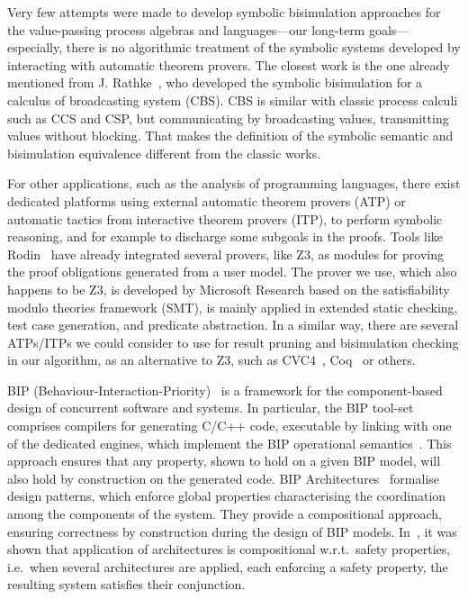 \documentclass[smallcondensed]{svjour3}
\newcommand{\TODO}[1]{\textcolor{red}{\textbf{[TODO:#1]}}}
\newcommand{\mdash}{---}
\newcommand{\ie}[1][\ ]{i.e.#1}
\newcommand{\wrt}[1][\ ]{w.r.t.#1}
\begin{document}


Very few attempts were made to develop symbolic bisimulation approaches
for the value-passing process algebras and languages\mdash our long-term goals\mdash
especially, there is no algorithmic treatment of the symbolic systems developed by
interacting with automatic theorem provers. The closest work is the
one already mentioned from J. Rathke~\cite{HennessyRathke:TCS98},
who developed the symbolic bisimulation for a
calculus of broadcasting system (CBS). CBS is similar with classic
process calculi such as CCS and CSP, but communicating by broadcasting
values, %
transmitting values without blocking. That makes the definition of
the symbolic semantic and bisimulation equivalence different from the
classic works.

For other applications, such as the analysis of 
programming languages, there exist dedicated platforms using
external automatic theorem 
provers (ATP) or automatic tactics from interactive theorem
provers (ITP), to perform symbolic reasoning, and for example to
discharge some subgoals in the proofs.
Tools like Rodin~\cite{deharbe2013,deharbe2014} have
already integrated several provers, like Z3, as modules for proving
the proof obligations generated from a user model. 
The prover we use, which also happens to be Z3, is developed by Microsoft Research
based on the satisfiability modulo 
theories framework (SMT), is mainly applied in extended static checking, test case
generation, and predicate abstraction.
In a similar way, there are several ATPs/ITPs we could consider to use for
result pruning and bisimulation checking in our algorithm, as an
alternative to Z3, such as CVC4~\cite{barrett:CAV2011},
Coq~\cite{armand:CPP2011} or others. 

BIP
(Behaviour-Interaction-Priority)~\cite{bip} is a framework for the
component-based design of concurrent software and systems.  In
particular, the BIP tool-set comprises compilers for generating C/C++
code, executable by linking with one of the dedicated engines, which
implement the BIP operational semantics~\cite{BarBliu15-offer-scico}.  This
approach ensures that any property, shown to hold on a given BIP
model, will also hold by construction on the generated code.
BIP Architectures~\cite{AttieBBJS16-architectures-faoc} formalise
design patterns, which enforce global properties 
characterising the coordination among the components of the
system. They provide a compositional approach, ensuring
correctness by construction during the design of BIP models.
In~\cite{AttieBBJS16-architectures-faoc}, it was shown that
application of architectures is compositional \wrt safety properties,
\ie when several architectures are applied, each enforcing a safety
property, the resulting system satisfies their conjunction.
\end{document}
